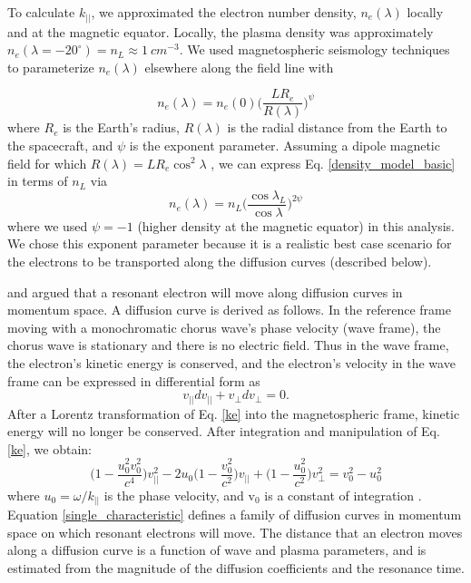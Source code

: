 To calculate $k_{||}$, we approximated the electron number density, $n_e(\lambda)$ locally and at the magnetic equator. Locally, the plasma density was approximately $n_e(\lambda = -20^\circ) = n_L \approx 1 \ cm^{-3}$. We used  magnetospheric seismology techniques \citep[e.g.][]{Takahashi2007} to parameterize $n_e(\lambda)$ elsewhere along the field line with

\begin{equation}
n_e(\lambda) = n_e(0) \bigg( \frac{L R_e}{R(\lambda)} \bigg)^\psi
\label{density_model_basic}
\end{equation} where $R_e$ is the Earth's radius, $R(\lambda)$ is the radial distance from the Earth to the spacecraft, and $\psi$ is the exponent parameter. Assuming a dipole magnetic field for which $R(\lambda) = L R_e \cos^2{\lambda}$ \citep[e.g.][]{Schulz1974}, we can express Eq. \ref{density_model_basic} in terms of $n_L$ via 
\begin{equation}
n_e(\lambda) = n_{L} \bigg( \frac{\cos{\lambda_{L}}}{\cos{\lambda}} \bigg)^{2 \psi}
\end{equation} where we used $\psi = -1$ (higher density at the magnetic equator) in this analysis. We chose this exponent parameter because it is a realistic best case scenario for the electrons to be transported along the diffusion curves (described below).

\citet{Walker1993} and \citet{Summers1998} argued that a resonant electron will move along diffusion curves in momentum space. A diffusion curve is derived as follows. In the reference frame moving with a monochromatic chorus wave's phase velocity (wave frame), the chorus wave is stationary and there is no electric field. Thus in the wave frame, the electron's kinetic energy is conserved, and the electron's velocity in the wave frame can be expressed in differential form as
\begin{equation}
v_{||} dv_{||} + v_{\perp} dv_{\perp} = 0.
\label{ke}
\end{equation} After a Lorentz transformation of Eq. \ref{ke} into the magnetospheric frame, kinetic energy will no longer be conserved. After integration and manipulation of Eq. \ref{ke}, we obtain:
\begin{equation}
\bigg( 1 - \frac{u_0^2 v_0^2}{c^4} \bigg) v_{||}^2 - 2 u_0 \bigg( 1 - \frac{v_0^2}{c^2} \bigg) v_{||} + \bigg( 1 - \frac{u_0^2}{c^2} \bigg) v_\perp^2 = v_0^2 - u_0^2
\label{single_characteristic}
\end{equation} where $u_0 = \omega /k_{||}$ is the phase velocity, and $\mathrm{v}_0$ is a constant of integration \citep{Walker1993, Summers1998}. Equation \ref{single_characteristic} defines a family of diffusion curves in momentum space on which resonant electrons will move. The distance that an electron moves along a diffusion curve is a function of wave and plasma parameters, and is estimated from the magnitude of the diffusion coefficients and the resonance time.

